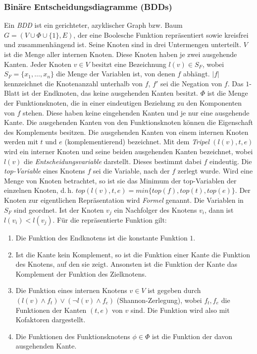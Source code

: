 \subsubsection{Binäre Entscheidungsdiagramme (BDDs)}
\label{sec:bdd}
Ein \emph{BDD} ist ein gerichteter, azyklischer Graph bzw. Baum $G = (V \cup \Phi \cup \{1\},E)$, der eine Boolesche Funktion repräsentiert sowie kreisfrei und zusammenhängend ist. Seine Knoten sind in drei Untermengen unterteilt. $V$ ist die Menge aller internen Knoten. Diese Knoten haben je zwei ausgehende Kanten. Jeder Knoten $v \in V$ besitzt eine Bezeichnung $l(v) \in S_F$, wobei $S_F = \{x_1, \dots, x_n\}$ die Menge der Variablen ist, von denen $f$ abhängt. $|f|$ kennzeichnet die Knotenanzahl unterhalb von $f$, $f'$ sei die Negation von $f$. Das $1$-Blatt ist der Endknoten, das keine ausgehenden Kanten besitzt. $\Phi$ ist die Menge der Funktionsknoten, die in einer eindeutigen Beziehung zu den Komponenten von $f$ stehen. Diese haben keine eingehenden Kanten und je nur eine ausgehende Kante. Die ausgehenden Kanten von den Funktionsknoten können die Eigenschaft des Komplements besitzen. Die ausgehenden Kanten von einem internen Knoten werden mit $t$ und $e$ (komplementierend) bezeichnet. Mit dem \emph{Tripel} $(l(v), t, e)$ wird ein interner Knoten und seine beiden ausgehenden Kanten bezeichnet, wobei $l(v)$ die \emph{Entscheidungsvariable} darstellt. Dieses bestimmt dabei $f$ eindeutig. Die \emph{top-Variable} eines Knotens $f$ sei die Variable, nach der $f$ zerlegt wurde. Wird eine Menge von Knoten betrachtet, so ist sie das Minimum der top-Variablen der einzelnen Knoten, d.\,h. $top(l(v), t, e) = min \{ top(f), top(t), top(e) \}$. Der Knoten zur eigentlichen Repräsentation wird \emph{Formel} genannt. Die Variablen in $S_F$ sind geordnet. Ist der Knoten $v_j$ ein Nachfolger des Knotens $v_i$, dann ist $l(v_i) < l(v_j)$. Für die repräsentierte Funktion gilt:
\begin{enumerate}
	\item Die Funktion des Endknotens ist die konstante Funktion $1$.
	\item Ist die Kante kein Komplement, so ist die Funktion einer Kante die Funktion des Knotens, auf den sie zeigt. Ansonsten ist die Funktion der Kante das Komplement der Funktion des Zielknotens.
	\item Die Funktion eines internen Knotens $v \in V$ ist gegeben durch $(l(v) \wedge f_t) \vee (\neg l(v) \wedge f_e)$ (Shannon-Zerlegung), wobei $f_t, f_e$ die Funktionen der Kanten $(t, e)$ von $v$ sind. Die Funktion wird also mit Kofaktoren dargestellt.
	\item Die Funktionen des Funktionsknotens $\phi \in \Phi$ ist die Funktion der davon ausgehenden Kante.
\end{enumerate}
